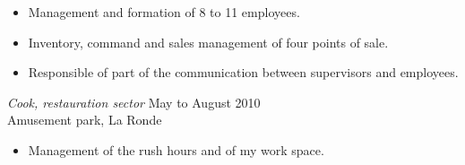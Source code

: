 \documentclass{res}
\begin{document}
\begin{resume}
{	\vspace{0.05in}
	\begin{itemize} \itemsep -2pt
		\item Management and formation of 8 to 11 employees.
		\item Inventory, command and sales management of four points of sale.
		\item Responsible of part of the communication between supervisors and employees.
	\end{itemize}


	{\sl Cook, restauration sector}
		\hfill May to August 2010 \\
	Amusement park, La Ronde

	\vspace{0.05in}
	\begin{itemize} \itemsep -2pt
		\item Management of the rush hours and of my work space.
	\end{itemize}
}

\vspace{0.1in}

\end{resume}
\end{document}
